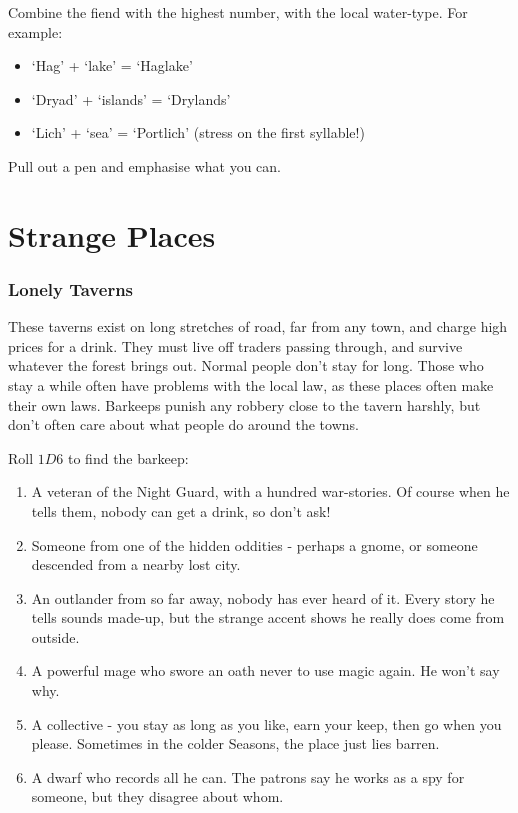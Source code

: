 \begin{multicols}{2}

Combine the fiend with the highest number, with the local water-type.
For example:

\begin{itemize}
\item
  `Hag' + `lake' = `Haglake'
\item
  `Dryad' + `islands' = `Drylands'
\item
  `Lich' + `sea' = `Portlich' (stress on the first syllable!)
\end{itemize}


Pull out a pen and emphasise what you can.

\end{multicols}

\section{Strange Places}

\begin{multicols}{2}

\subsubsection{Lonely Taverns}
\label{lonelyTaverns}

These taverns exist on long stretches of road, far from any town, and
charge high prices for a drink. They must live off traders passing
through, and survive whatever the forest brings out. Normal people don't
stay for long. Those who stay a while often have problems with the local
law, as these places often make their own laws. Barkeeps punish any
robbery close to the tavern harshly, but don't often care about what
people do around the towns.

Roll $1D6$ to find the barkeep:

\begin{enumerate}
\item
  A veteran of the Night Guard, with a hundred war-stories. Of course
  when he tells them, nobody can get a drink, so don't ask!
\item
  Someone from one of the hidden oddities - perhaps a gnome, or someone
  descended from a nearby lost city.
\item
  An outlander from so far away, nobody has ever heard of it. Every
  story he tells sounds made-up, but the strange accent shows he really
  does come from outside.
\item
  A powerful mage who swore an oath never to use magic again. He won't
  say why.
\item
  A collective - you stay as long as you like, earn your keep, then go
  when you please. Sometimes in the colder Seasons, the place just lies
  barren.
\item
  A dwarf who records all he can. The patrons say he works as a spy for
  someone, but they disagree about whom.
\end{enumerate}

\end{multicols}
